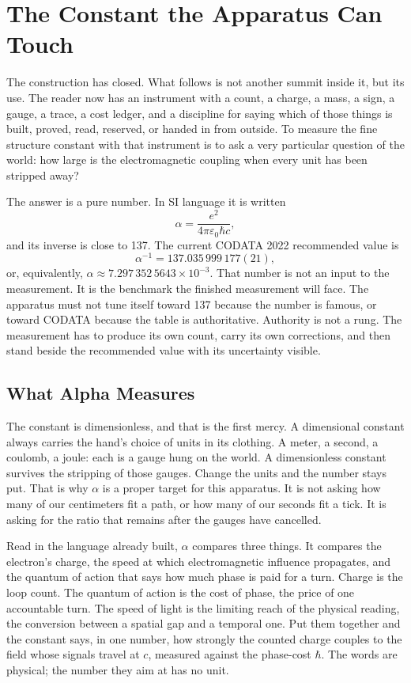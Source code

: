 \chapter{The Constant the Apparatus Can Touch}

The construction has closed. What follows is not another summit inside it, but its use. The reader now has an
instrument with a count, a charge, a mass, a sign, a gauge, a trace, a cost ledger, and a discipline for saying
which of those things is built, proved, read, reserved, or handed in from outside. To measure the fine structure
constant with that instrument is to ask a very particular question of the world: how large is the electromagnetic
coupling when every unit has been stripped away?

The answer is a pure number. In SI language it is written
\[
  \alpha = \frac{e^2}{4\pi\varepsilon_0\hbar c},
\]
and its inverse is close to 137. The current CODATA 2022 recommended value is
\[
  \alpha^{-1}=137.035\,999\,177(21),
\]
or, equivalently, \(\alpha \approx 7.297\,352\,5643\times 10^{-3}\). That number is not an input to the
measurement. It is the benchmark the finished measurement will face. The apparatus must not tune itself toward
137 because the number is famous, or toward CODATA because the table is authoritative. Authority is not a rung.
The measurement has to produce its own count, carry its own corrections, and then stand beside the recommended
value with its uncertainty visible.

\section{What Alpha Measures}

The constant is dimensionless, and that is the first mercy. A dimensional constant always carries the hand's
choice of units in its clothing. A meter, a second, a coulomb, a joule: each is a gauge hung on the world. A
dimensionless constant survives the stripping of those gauges. Change the units and the number stays put. That is
why \(\alpha\) is a proper target for this apparatus. It is not asking how many of our centimeters fit a path, or
how many of our seconds fit a tick. It is asking for the ratio that remains after the gauges have cancelled.

Read in the language already built, \(\alpha\) compares three things. It compares the electron's charge, the
speed at which electromagnetic influence propagates, and the quantum of action that says how much phase is paid
for a turn. Charge is the loop count. The quantum of action is the cost of phase, the price of one accountable
turn. The speed of light is the limiting reach of the physical reading, the conversion between a spatial gap and
a temporal one. Put them together and the constant says, in one number, how strongly the counted charge couples
to the field whose signals travel at \(c\), measured against the phase-cost \(\hbar\). The words are physical;
the number they aim at has no unit.

